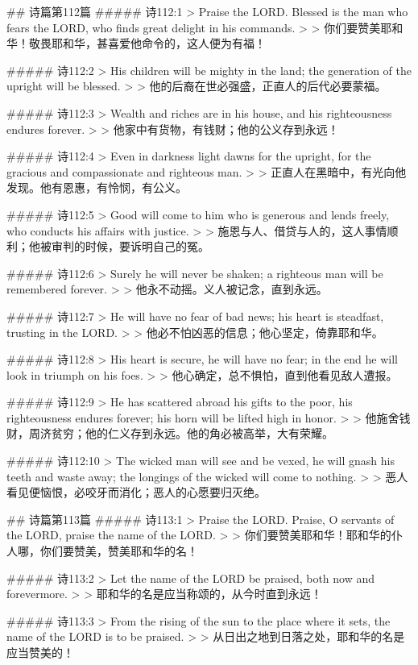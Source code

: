 ## 诗篇第112篇
##### 诗112:1
> Praise the LORD. Blessed is the man who fears the LORD, who finds great delight in his commands.
>
> 你们要赞美耶和华！敬畏耶和华，甚喜爱他命令的，这人便为有福！


##### 诗112:2
> His children will be mighty in the land; the generation of the upright will be blessed.
>
> 他的后裔在世必强盛，正直人的后代必要蒙福。


##### 诗112:3
> Wealth and riches are in his house, and his righteousness endures forever.
>
> 他家中有货物，有钱财；他的公义存到永远！


##### 诗112:4
> Even in darkness light dawns for the upright, for the gracious and compassionate and righteous man.
>
> 正直人在黑暗中，有光向他发现。他有恩惠，有怜悯，有公义。


##### 诗112:5
> Good will come to him who is generous and lends freely, who conducts his affairs with justice.
>
> 施恩与人、借贷与人的，这人事情顺利；他被审判的时候，要诉明自己的冤。


##### 诗112:6
> Surely he will never be shaken; a righteous man will be remembered forever.
>
> 他永不动摇。义人被记念，直到永远。


##### 诗112:7
> He will have no fear of bad news; his heart is steadfast, trusting in the LORD.
>
> 他必不怕凶恶的信息；他心坚定，倚靠耶和华。


##### 诗112:8
> His heart is secure, he will have no fear; in the end he will look in triumph on his foes.
>
> 他心确定，总不惧怕，直到他看见敌人遭报。


##### 诗112:9
> He has scattered abroad his gifts to the poor, his righteousness endures forever; his horn will be lifted high in honor.
>
> 他施舍钱财，周济贫穷；他的仁义存到永远。他的角必被高举，大有荣耀。


##### 诗112:10
> The wicked man will see and be vexed, he will gnash his teeth and waste away; the longings of the wicked will come to nothing.
>
> 恶人看见便恼恨，必咬牙而消化；恶人的心愿要归灭绝。


## 诗篇第113篇
##### 诗113:1
> Praise the LORD. Praise, O servants of the LORD, praise the name of the LORD.
>
> 你们要赞美耶和华！耶和华的仆人哪，你们要赞美，赞美耶和华的名！


##### 诗113:2
> Let the name of the LORD be praised, both now and forevermore.
>
> 耶和华的名是应当称颂的，从今时直到永远！


##### 诗113:3
> From the rising of the sun to the place where it sets, the name of the LORD is to be praised.
>
> 从日出之地到日落之处，耶和华的名是应当赞美的！


